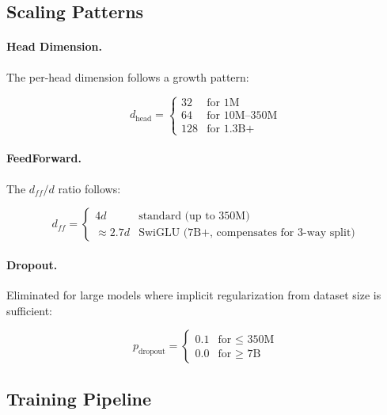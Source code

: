 \subsection{Scaling Patterns}

\paragraph{Head Dimension.}
The per-head dimension follows a growth pattern:

\begin{equation}
    d_{\text{head}} = \begin{cases}
        32 & \text{for 1M} \\
        64 & \text{for 10M--350M} \\
        128 & \text{for 1.3B+}
    \end{cases}
\end{equation}

\paragraph{FeedForward.}
The $d_{ff} / d$ ratio follows:

\begin{equation}
    d_{ff} = \begin{cases}
        4d & \text{standard (up to 350M)} \\
        \approx 2.7d & \text{SwiGLU (7B+, compensates for 3-way split)}
    \end{cases}
\end{equation}

\paragraph{Dropout.}
Eliminated for large models where implicit regularization from dataset
size is sufficient:

\begin{equation}
    p_{\text{dropout}} = \begin{cases}
        0.1 & \text{for $\leq$ 350M} \\
        0.0 & \text{for $\geq$ 7B}
    \end{cases}
\end{equation}

\subsection{Training Pipeline}

